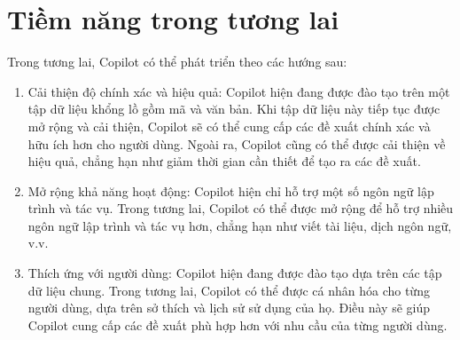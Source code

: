 \section{Tiềm năng trong tương lai}
Trong tương lai, Copilot có thể phát triển theo các hướng sau:
\begin{enumerate}
\item Cải thiện độ chính xác và hiệu quả: Copilot hiện đang được đào tạo trên một tập dữ liệu khổng lồ gồm mã và văn bản. Khi tập dữ liệu này tiếp tục được mở rộng và cải thiện, Copilot sẽ có thể cung cấp các đề xuất chính xác và hữu ích hơn cho người dùng. Ngoài ra, Copilot cũng có thể được cải thiện về hiệu quả, chẳng hạn như giảm thời gian cần thiết để tạo ra các đề xuất. 
\item Mở rộng khả năng hoạt động: Copilot hiện chỉ hỗ trợ một số ngôn ngữ lập trình và tác vụ. Trong tương lai, Copilot có thể được mở rộng để hỗ trợ nhiều ngôn ngữ lập trình và tác vụ hơn, chẳng hạn như viết tài liệu, dịch ngôn ngữ, v.v. 
\item Thích ứng với người dùng: Copilot hiện đang được đào tạo dựa trên các tập dữ liệu chung. Trong tương lai, Copilot có thể được cá nhân hóa cho từng người dùng, dựa trên sở thích và lịch sử sử dụng của họ. Điều này sẽ giúp Copilot cung cấp các đề xuất phù hợp hơn với nhu cầu của từng người dùng. 
\end{enumerate}
